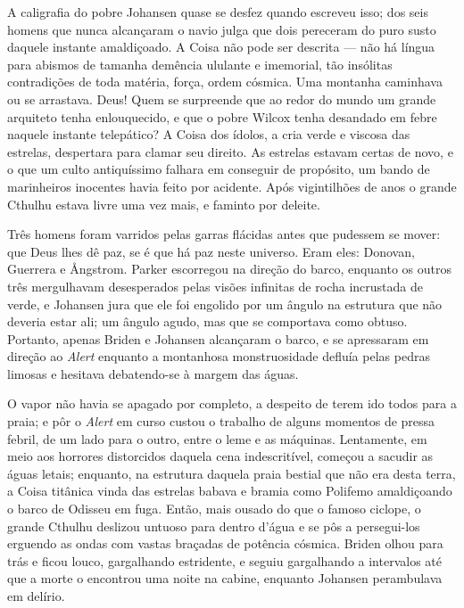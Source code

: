 A caligrafia do pobre Johansen quase se desfez quando escreveu isso; dos
seis homens que nunca alcançaram o navio julga que dois pereceram do
puro susto daquele instante amaldiçoado. A Coisa não pode ser descrita
--- não há língua para abismos de tamanha demência ululante e imemorial,
tão insólitas contradições de toda matéria, força, ordem cósmica. Uma
montanha caminhava ou se arrastava. Deus! Quem se surpreende que ao
redor do mundo um grande arquiteto tenha enlouquecido, e que o pobre
Wilcox tenha desandado em febre naquele instante telepático? A Coisa dos
ídolos, a cria verde e viscosa das estrelas, despertara para clamar seu
direito. As estrelas estavam certas de novo, e o que um culto
antiquíssimo falhara em conseguir de propósito, um bando de marinheiros
inocentes havia feito por acidente. Após vigintilhões de anos o grande
Cthulhu estava livre uma vez mais, e faminto por deleite.

Três homens foram varridos pelas garras flácidas antes que pudessem se
mover: que Deus lhes dê paz, se é que há paz neste universo. Eram eles:
Donovan, Guerrera e Ångstrom. Parker escorregou na direção do barco,
enquanto os outros três mergulhavam desesperados pelas visões infinitas
de rocha incrustada de verde, e Johansen jura que ele foi engolido por
um ângulo na estrutura que não deveria estar ali; um ângulo agudo, mas
que se comportava como obtuso. Portanto, apenas Briden e Johansen
alcançaram o barco, e se apressaram em direção ao \emph{Alert} enquanto
a montanhosa monstruosidade defluía pelas pedras limosas e hesitava
debatendo-se à margem das águas.

O vapor não havia se apagado por completo, a despeito de terem ido todos
para a praia; e pôr o \emph{Alert} em curso custou o trabalho de alguns
momentos de pressa febril, de um lado para o outro, entre o leme e as
máquinas. Lentamente, em meio aos horrores distorcidos daquela cena
indescritível, começou a sacudir as águas letais; enquanto, na estrutura
daquela praia bestial que não era desta terra, a Coisa titânica vinda
das estrelas babava e bramia como Polifemo amaldiçoando o barco de
Odisseu em fuga. Então, mais ousado do que o famoso ciclope, o grande
Cthulhu deslizou untuoso para dentro d'água e se pôs a persegui-los
erguendo as ondas com vastas braçadas de potência cósmica. Briden olhou
para trás e ficou louco, gargalhando estridente, e seguiu gargalhando a
intervalos até que a morte o encontrou uma noite na cabine, enquanto
Johansen perambulava em delírio.

